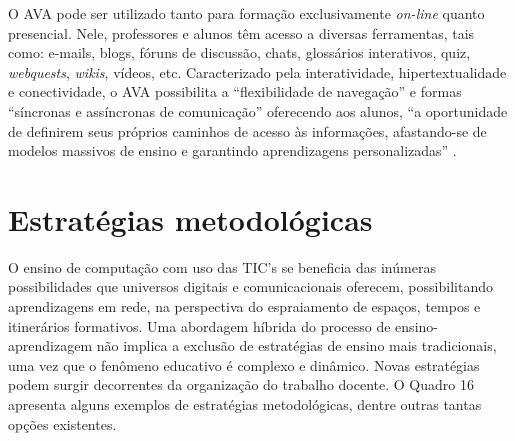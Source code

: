 \documentclass[
	12pt,				%
	openright,			%
  oneside,     %
	a4paper,			%
	chapter=TITLE,		%
	english,			%
	french,				%
	spanish,			%
	brazil				%
	]{abntex2}
\begin{document}
O AVA pode ser utilizado tanto para formação exclusivamente \textit{on-line} quanto presencial. Nele, professores e alunos têm acesso a diversas ferramentas, tais como: e-mails, blogs, fóruns de discussão, chats, glossários interativos, quiz, \textit{webquests}, \textit{wikis}, vídeos, etc. Caracterizado pela interatividade, hipertextualidade e conectividade, o AVA possibilita a ``flexibilidade de navegação'' e formas ``síncronas e assíncronas de comunicação'' oferecendo aos alunos, ``a oportunidade de definirem seus próprios caminhos de acesso às informações, afastando-se de modelos massivos de ensino e garantindo aprendizagens personalizadas'' \cite[p.~5]{silva2013interfaces}.

\section{Estratégias metodológicas}

O ensino de computação com uso das TIC's se beneficia das inúmeras possibilidades que universos digitais e comunicacionais oferecem, possibilitando aprendizagens em rede, na perspectiva do espraiamento de espaços, tempos e itinerários formativos. Uma abordagem híbrida do processo de ensino-aprendizagem não implica a exclusão de estratégias de ensino mais tradicionais, uma vez que o fenômeno educativo é complexo e dinâmico. Novas estratégias podem surgir decorrentes da organização do trabalho docente. O Quadro 16 apresenta alguns exemplos de estratégias metodológicas, dentre outras tantas opções existentes.
\end{document}
